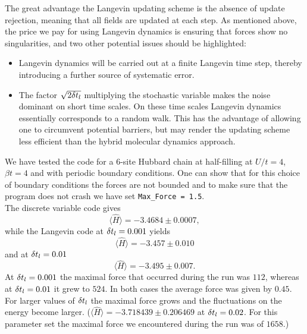 The great advantage the Langevin updating scheme is the absence of update rejection, meaning that all fields are updated at each step. As mentioned above, the price we pay for using Langevin dynamics is ensuring that forces show no singularities, and two other potential issues should be highlighted:
\begin{itemize}
\item   Langevin dynamics will be carried out at a finite  Langevin time step, thereby introducing a further source of systematic error.
\item   The factor $\sqrt{2 \delta t_{l}} $   multiplying the stochastic variable makes the  noise dominant  on short time scales.  On these time scales  Langevin dynamics essentially  corresponds to a random walk. This has the advantage of allowing one to circumvent potential barriers, but may render the updating scheme less efficient than the hybrid molecular dynamics approach.
\end{itemize}

We have tested the code for a 6-site Hubbard chain at half-filling  at $U/t = 4$,  $\beta t = 4$    and with periodic boundary conditions.   One can show that for this choice of boundary conditions the   forces are not bounded 
and to make sure that the program does not   crash we have  set \texttt{Max\_Force = 1.5}.\\
The discrete variable code gives
\begin{equation}
 \langle  \hat{H} \rangle  =  -3.4684 \pm 0.0007,
\end{equation} 
while the Langevin code at $ \delta t_{l} = 0.001$  yields 
\begin{equation}
 \langle  \hat{H} \rangle  =  -3.457 \pm 0.010 
\end{equation} 
and at $ \delta t_{l} = 0.01$ 
\begin{equation}
 \langle  \hat{H} \rangle  = -3.495 \pm 0.007\text{.}
\end{equation} 
 At $ \delta t_{l} = 0.001$   the maximal force that occurred during the run was 
$ 112$, whereas at $ \delta t_{l} = 0.01$ it grew to $524$.    In both cases the average force was given by $0.45$.   For larger values of  $ \delta t_{l} $ the maximal force grows and the fluctuations on the energy become  larger.  
($ \langle  \hat{H} \rangle  =  -3.718439    \pm   0.206469 $  at $ \delta t_{l} = 0.02$. For this parameter set  the maximal force we encountered during the run was of $1658$.)

